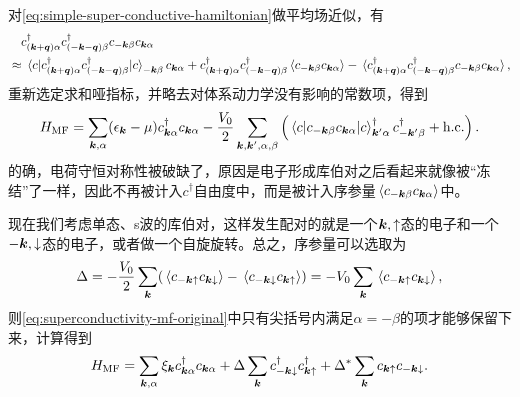 对\eqref{eq:simple-super-conductive-hamiltonian}做平均场近似，有
\[
    \begin{aligned}
        & \quad {c}^\dagger_{(\vb*{k} + \vb*{q}) \alpha} {c}^\dagger_{( - \vb*{k} - \vb*{q}) \beta} {c}_{-\vb*{k} \beta} {c}_{\vb*{k} \alpha} \\
        &\approx \expval*{{c}^\dagger_{(\vb*{k} + \vb*{q}) \alpha} {c}^\dagger_{( - \vb*{k} - \vb*{q}) \beta}} {c}_{-\vb*{k} \beta} {c}_{\vb*{k} \alpha} + {c}^\dagger_{(\vb*{k} + \vb*{q}) \alpha} {c}^\dagger_{( - \vb*{k} - \vb*{q}) \beta} \expval*{{c}_{-\vb*{k} \beta} {c}_{\vb*{k} \alpha}} - \expval*{{c}^\dagger_{(\vb*{k} + \vb*{q}) \alpha} {c}^\dagger_{( - \vb*{k} - \vb*{q}) \beta} {c}_{-\vb*{k} \beta} {c}_{\vb*{k} \alpha}},
    \end{aligned}
\]
重新选定求和哑指标，并略去对体系动力学没有影响的常数项，得到
\begin{equation}
    {H}_\text{MF} = \sum_{\vb*{k}, \alpha} (\epsilon_{\vb*{k}} - \mu) {c}_{\vb*{k} \alpha}^\dagger {c}_{\vb*{k} \alpha} - \frac{V_0}{2} \sum_{\vb*{k}, \vb*{k}', \alpha, \beta} \left(
        \expval*{{c}_{-\vb*{k} \beta} {c}_{\vb*{k} \alpha}} {c}^\dagger_{\vb*{k}' \alpha} {c}^\dagger_{- \vb*{k}' \beta} + \text{h.c.} 
    \right).
    \label{eq:superconductivity-mf-original}
\end{equation}
的确，电荷守恒对称性被破缺了，原因是电子形成库伯对之后看起来就像被“冻结”了一样，因此不再被计入${c}^\dagger$自由度中，而是被计入序参量$\expval*{{c}_{-\vb*{k} \beta} {c}_{\vb*{k} \alpha}}$中。

现在我们考虑单态、s波的库伯对，这样发生配对的就是一个$\vb*{k}, \uparrow$态的电子和一个$-\vb*{k}, \downarrow$态的电子，或者做一个自旋旋转。总之，序参量可以选取为
\begin{equation}
    \Delta = - \frac{V_0}{2} \sum_{\vb*{k}} (
        \expval*{{c}_{-\vb*{k}\uparrow} {c}_{\vb*{k} \downarrow}} - \expval*{{c}_{-\vb*{k} \downarrow} {c}_{\vb*{k} \uparrow}}
    ) = -V_0 \sum_{\vb*{k}} \expval*{{c}_{-\vb*{k}\uparrow} {c}_{\vb*{k} \downarrow}} ,
    \label{eq:superconductive-order-parameter}
\end{equation}
则\eqref{eq:superconductivity-mf-original}中只有尖括号内满足$\alpha = -\beta$的项才能够保留下来，计算得到
\begin{equation}
    {H}_\text{MF} = \sum_{\vb*{k}, \alpha} \xi_{\vb*{k}} {c}_{\vb*{k} \alpha}^\dagger {c}_{\vb*{k} \alpha} 
    + \Delta \sum_{\vb*{k}} {c}_{-\vb*{k} \downarrow}^\dagger {c}^\dagger_{\vb*{k} \uparrow}
    + \Delta^* \sum_{\vb*{k}} {c}_{\vb*{k} \uparrow} {c}_{-\vb*{k} \downarrow}.
    \label{eq:s-wave-superconductive-hamiltonian}
\end{equation}

